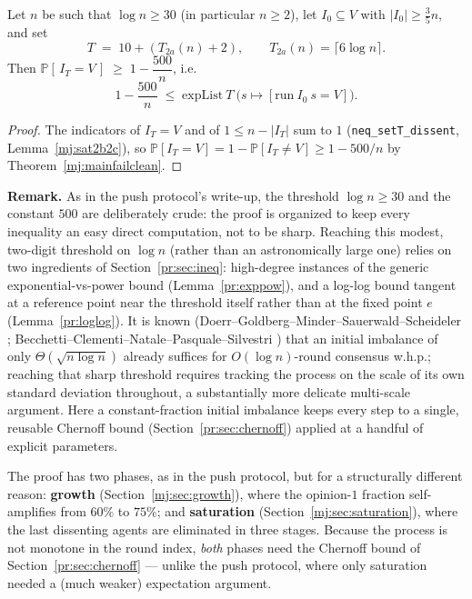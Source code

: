 \begin{theorem}
  \label{mj:main}
  \rocqok
  Let $n$ be such that $\log n \ge 30$ (in particular $n \ge 2$), let
  $I_0 \subseteq V$ with $|I_0| \ge \tfrac35 n$, and set
  \[
    T \;=\; 10 + (T_{2a}(n) + 2), \qquad T_{2a}(n) = \lceil 6\log n \rceil.
  \]
  Then $\mathbb{P}[\, I_T = V \,] \;\ge\; 1 - \dfrac{500}{n}$, i.e.
  \[
    1 - \frac{500}{n} \;\le\;
    \mathrm{expList}\ T\ \bigl(s \mapsto [\mathrm{run}\ I_0\ s = V]\bigr).
  \]
\end{theorem}
\begin{proof}
  \rocqok
  The indicators of $I_T = V$ and of $1 \le n - |I_T|$ sum to $1$
  (\texttt{neq\_setT\_dissent}, Lemma~\ref{mj:sat2b2c}), so
  $\mathbb{P}[I_T=V] = 1-\mathbb{P}[I_T\ne V] \ge 1-500/n$ by
  Theorem~\ref{mj:mainfailclean}.
\end{proof}

\noindent\textbf{Remark.}
  As in the push protocol's write-up, the threshold $\log n \ge 30$ and
  the constant $500$ are deliberately crude: the proof is organized to keep
  every inequality an easy direct computation, not to be sharp. Reaching
  this modest, two-digit threshold on $\log n$ (rather than an
  astronomically large one) relies on two ingredients of
  Section~\ref{pr:sec:ineq}: high-degree instances of the generic
  exponential-vs-power bound (Lemma~\ref{pr:exppow}), and a log-log bound
  tangent at a reference point near the threshold itself rather than at the
  fixed point $e$ (Lemma~\ref{pr:loglog}). It is known
  (Doerr--Goldberg--Minder--Sauerwald--Scheideler \cite{DGMSS11};
  Becchetti--Clementi--Natale--Pasquale--Silvestri \cite{BCNPS15}) that an
  initial imbalance of only $\Theta(\sqrt{n\log n})$ already suffices for
  $O(\log n)$-round consensus w.h.p.; reaching that sharp threshold
  requires tracking the process on the scale of its own standard deviation
  throughout, a substantially more delicate multi-scale argument. Here a
  constant-fraction initial imbalance keeps every step to a single,
  reusable Chernoff bound (Section~\ref{pr:sec:chernoff}) applied at a
  handful of explicit parameters.

The proof has two phases, as in the push protocol, but for a structurally
different reason: \textbf{growth} (Section~\ref{mj:sec:growth}), where the
opinion-$1$ fraction self-amplifies from $60\%$ to $75\%$; and
\textbf{saturation} (Section~\ref{mj:sec:saturation}), where the last
dissenting agents are eliminated in three stages. Because the process is
not monotone in the round index, \emph{both} phases need the Chernoff bound
of Section~\ref{pr:sec:chernoff} --- unlike the push protocol, where only
saturation needed a (much weaker) expectation argument.

